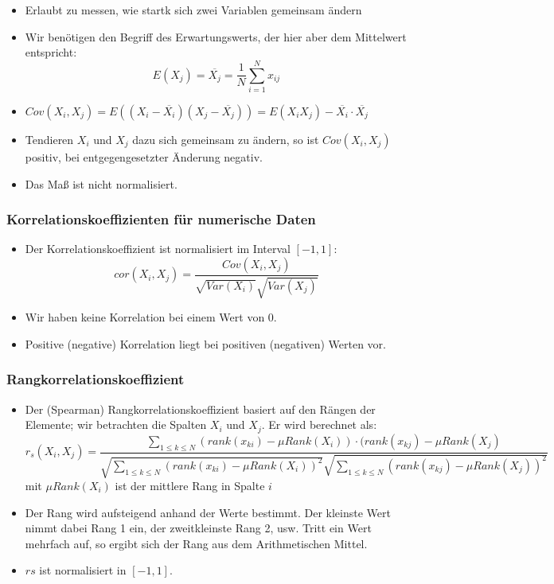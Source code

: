 \documentclass{scrartcl}
\begin{document}
\begin{itemize}
	\item Erlaubt zu messen, wie startk sich zwei Variablen gemeinsam ändern
	\item Wir benötigen den Begriff des Erwartungswerts, der hier aber dem 
	Mittelwert entspricht:
	\[ E(X_j) = \overline{X_j} = \frac{1}{N} \sum_{i=1}^{N} x_{ij} \]
	\item $ Cov(X_i,X_j) = E((X_i - \overline{X_i})(X_j - \overline{X_j})) = 
	E(X_iX_j) - \overline{X_i} \cdot \overline{X_j} $
	\item Tendieren $ X_i $ und $ X_j $ dazu sich gemeinsam zu ändern, so ist $ 
	Cov(X_i,X_j) $ positiv, bei entgegengesetzter Änderung negativ.
	\item Das Maß ist nicht normalisiert.
\end{itemize}

\subsubsection{Korrelationskoeffizienten für numerische Daten}

\begin{itemize}
	\item Der Korrelationskoeffizient ist normalisiert im Interval $ [-1,1] $:
	\[ cor(X_i,X_j) = \frac{Cov(X_i,X_j)}{\sqrt{Var(X_i)} \sqrt{Var(X_j)}} \]
	\item Wir haben keine Korrelation bei einem Wert von 0.
	\item Positive (negative) Korrelation liegt bei positiven (negativen) 
	Werten vor.
\end{itemize}

\subsubsection{Rangkorrelationskoeffizient}

\begin{itemize}
	\item Der (Spearman) Rangkorrelationskoeffizient basiert auf den Rängen der 
	Elemente; wir betrachten die Spalten $ X_i $ und $ X_j $. Er wird berechnet 
	als:
	\[ r_s(X_i,X_j) = \frac{\sum_{1 \leq k \leq N} (rank(x_{ki}) - 
	\mu Rank(X_i)) \cdot (rank(x_{kj}) - \mu Rank(X_j)}{\sqrt{\sum_{1 \leq k 
	\leq N} (rank(x_{ki}) - \mu Rank(X_i))^2} \sqrt{\sum_{1 \leq k \leq N} 
(rank(x_{kj}) - \mu Rank(X_j))^2}} \]
	mit $ \mu Rank(X_i) $ ist der mittlere Rang in Spalte $ i $
	\item Der Rang wird aufsteigend anhand der Werte bestimmt. Der kleinste 
	Wert nimmt dabei Rang 1 ein, der zweitkleinste Rang 2, usw. Tritt ein Wert 
	mehrfach auf, so ergibt sich der Rang aus dem Arithmetischen Mittel.
	\item $ rs $ ist normalisiert in $ [-1,1] $.
\end{itemize}
\end{document}
